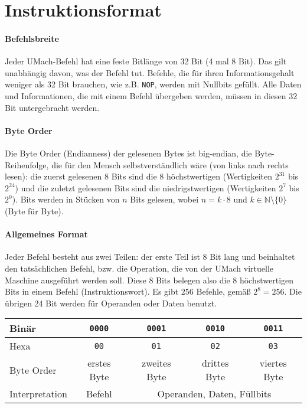 \section{Instruktionsformat}

\paragraph{Befehlsbreite}
Jeder UMach-Befehl hat eine feste Bitlänge von 32 Bit (4 mal 8 Bit).
Das gilt unabhängig davon, was der Befehl tut. Befehle, die für ihren
Informationsgehalt weniger als 32 Bit brauchen, wie z.B. \texttt{NOP},
werden mit Nullbits gefüllt. Alle Daten und Informationen, die mit einem
Befehl übergeben werden, müssen in diesen 32 Bit untergebracht werden.

\paragraph{Byte Order}
Die Byte Order (Endianness) der gelesenen \glspl{Byte} ist
big-endian, die Byte-Reihenfolge, die für den Mensch selbstverständlich wäre
(von links nach rechts lesen):
die zuerst gelesenen 8 Bits sind die 8 höchstwertigen (Wertigkeiten $2^{31}$ bis
$2^{24}$) und die zuletzt gelesenen Bits sind die niedrigstwertigen
(Wertigkeiten $2^{7}$ bis $2^{0}$).
Bits werden in Stücken von $n$ Bits gelesen, wobei $n = k \cdot 8$ und
$k \in \mathbb{N} \setminus\{0\}$ (Byte für Byte).


\paragraph{Allgemeines Format}
Jeder Befehl besteht aus zwei Teilen: der erste Teil ist 8 Bit lang und
beinhaltet den tatsächlichen Befehl, bzw. die Operation, die von der UMach
virtuelle Maschine ausgeführt werden soll.
Diese 8 Bits belegen also die 8 höchstwertigen Bits in einem Befehl
(Instruktionswort).
Es gibt $256$ Befehle, gemäß $2^{8} = 256$.
Die übrigen 24 Bit werden für Operanden oder Daten benutzt.

\begin{center}
  \begin{tabular}{l|*{4}{c|}}
    Binär &
    \texttt{0000} & \texttt{0001} & \texttt{0010} & \texttt{0011} \\\hline
    Hexa  &
    \texttt{00}   & \texttt{01}   & \texttt{02}   & \texttt{03}   \\\hline
    Byte Order &
    erstes Byte   & zweites Byte  & drittes Byte  & viertes Byte  \\\hline
    Interpretation &
    Befehl    &  \multicolumn{3}{c|}{Operanden, Daten, Füllbits} \\\hline
  \end{tabular}
\end{center}



